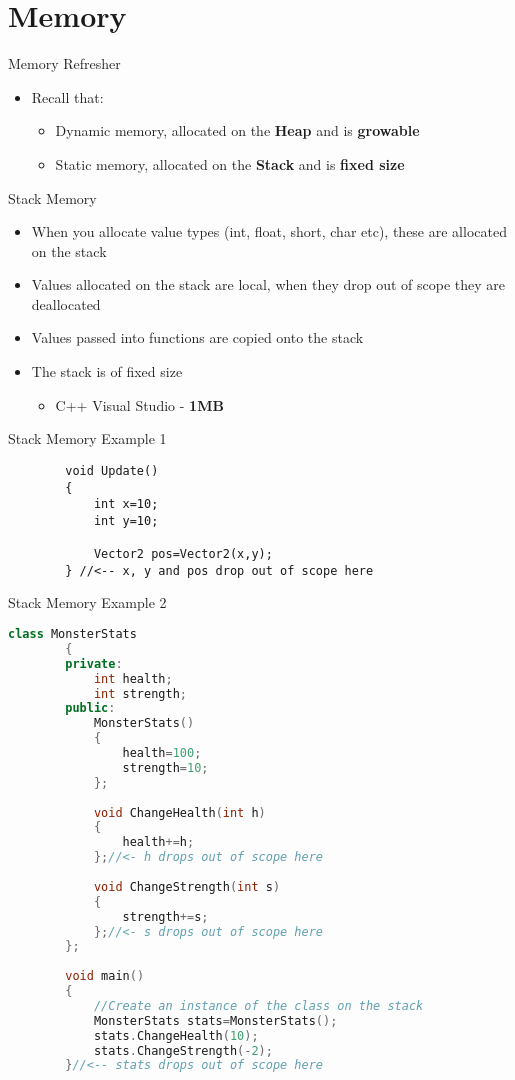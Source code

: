 \part{Memory}
\frame{\partpage}

\begin{frame}{Memory Refresher}
	\begin{itemize}
		\pause \item Recall that:
		\begin{itemize}
			\pause \item Dynamic memory, allocated on the \textbf{Heap} and is \textbf{growable}
			\pause \item Static memory, allocated on the \textbf{Stack} and is \textbf{fixed size}
		\end{itemize}
	\end{itemize}
\end{frame}

\begin{frame}{Stack Memory}
	\begin{itemize}
		\pause \item When you allocate value types (int, float, short, char etc), these are allocated on the stack
		\pause \item Values allocated on the stack are local, when they drop out of scope they are deallocated  
		\pause \item Values passed into functions are copied onto the stack
		\pause \item The stack is of fixed size
		\begin{itemize}
			\item C++ Visual Studio - \textbf{1MB}
		\end{itemize}
	\end{itemize}
\end{frame}

\begin{frame}[fragile]{Stack Memory Example 1}
	\begin{lstlisting}
		void Update()
		{
			int x=10;
			int y=10;
	
			Vector2 pos=Vector2(x,y);
		} //<-- x, y and pos drop out of scope here
	\end{lstlisting} 
\end{frame}

\begin{frame}[fragile]{Stack Memory Example 2}
	\begin{lstlisting}[language=C++,basicstyle=\tiny,]
		class MonsterStats
		{
		private:
			int health;
			int strength;
		public:
			MonsterStats()
			{
				health=100;
				strength=10;
			};
	
			void ChangeHealth(int h)
			{
				health+=h;
			};//<- h drops out of scope here
	
			void ChangeStrength(int s)
			{
				strength+=s;
			};//<- s drops out of scope here
		};
	
		void main()
		{		
			//Create an instance of the class on the stack
			MonsterStats stats=MonsterStats();
			stats.ChangeHealth(10);
			stats.ChangeStrength(-2);
		}//<-- stats drops out of scope here
	\end{lstlisting}
\end{frame}

